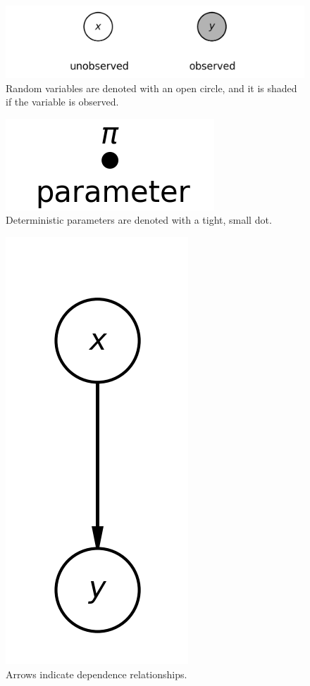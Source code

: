 \begin{figure}[H]
    \centering
    \includegraphics[width=0.5\paperwidth]{../GraphicalModels/fig/RandomVar.png}
    \caption{Random variables are denoted with an open circle, and it is shaded if the variable is observed.}
    \label{fig:random-var}
\end{figure}
\begin{figure}[H]
    \centering
    \includegraphics[width=0.15\paperwidth]{../GraphicalModels/fig/DeterministicParam.png}
    \caption{Deterministic parameters are denoted with a tight, small dot.}
    \label{fig:deterministic-param}
\end{figure}
\begin{figure}[H]
    \centering
    \includegraphics[width=0.1\paperwidth]{../GraphicalModels/fig/arrows.png}
    \caption{Arrows indicate dependence relationships.}
    \label{fig:arrows}
\end{figure}
